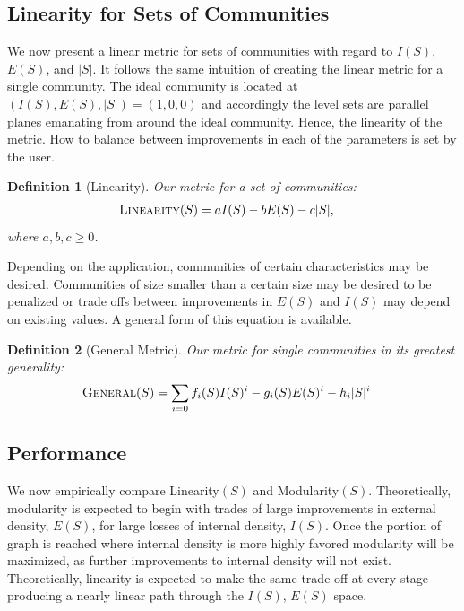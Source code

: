 \documentclass[conference]{IEEEtran}
\newtheorem{definition}{Definition}
\begin{document}
\subsection{Linearity for Sets of Communities}

We now present a linear metric for sets of communities with regard to $I(S)$, $E(S)$, and $|S|$.  It follows the same intuition of creating the linear metric for a single community.  The ideal community is located at $(I(S), E(S), |S|) = (1, 0, 0)$ and accordingly the level sets are parallel planes emanating from around the ideal community.  Hence, the linearity of the metric.  How to balance between improvements in each of the parameters is set by the user.
\begin{definition}[Linearity]
 Our metric for a set of communities:
  \begin{align*}
   \text{\sc Linearity}(S) &= a I(S) - b E(S) - c |S|,
  \end{align*}
where $a,b,c \geq 0$.
\end{definition}
Depending on the application, communities of certain characteristics may be desired.  Communities of size smaller than a certain size may be desired to be penalized or trade offs between improvements in $E(S)$ and $I(S)$ may depend on existing values.  A general form of this equation is available.
\begin{definition}[General Metric]
 Our metric for single communities in its greatest generality:
  \begin{align*}
   \text{\sc General} (S) &= \sum\limits_{i = 0} f_i(S) I(S)^i - g_i(S) E(S)^i - h_i |S|^i
  \end{align*}
\end{definition}



\subsection{Performance}
We now empirically compare {\sc Linearity}$(S)$ and {\sc Modularity}$(S)$.  Theoretically, modularity is expected to begin with trades of large improvements in external density, $E(S)$, for large losses of internal density, $I(S)$.  Once the portion of graph is reached where internal density is more highly favored modularity will be maximized, as further improvements to internal density will not exist.  Theoretically, linearity is expected to make the same trade off at every stage producing a nearly linear path through the $I(S)$, $E(S)$ space.
\end{document}
